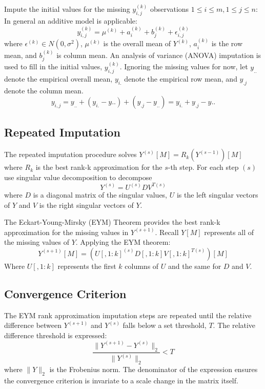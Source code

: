\documentclass[12pt,twoside]{dukestatscithesis}
\theoremstyle{definition}
\theoremstyle{definition}
\theoremstyle{definition}
\theoremstyle{remark}
\begin{document}
Impute the initial values for the missing \(y^{(k)}_{i,j}\) observations
\(1 \leq i \leq m, 1 \leq j \leq n\): In general an additive model is
applicable:
\[y^{(k)}_{i,j} = \mu^{(k)} + a^{(k)}_i + b^{(k)}_j + \epsilon^{(k)}_{i,j}\]
where \(\epsilon^{(k)} \in N(0,\sigma^2)\), \(\mu^{(k)}\) is the overall
mean of \(Y^{(k)}\), \(a^{(k)}_i\) is the row mean, and \(b^{(k)}_j\) is
column mean. An analysis of variance (ANOVA) imputation is used to fill
in the initial values, \(y^{(k)}_{i,j}\). Ignoring the missing values
for now, let \(y_{..}\) denote the empirical overall mean, \(y_{i.}\)
denote the empirical row mean, and \(y_{.j}\) denote the column mean.
\[y_{i,j} = y_{..} + (y_{i.}-y{..}) + (y_{.j}-y_{..}) = y_{i.} + y_{.j} - y{..}\]

\subsection{Repeated Imputation}\label{repeated-imputation}

The repeated imputation procedure solves
\(Y^{(s)}[M] = R_k(Y^{(s-1)})[M]\) where \(R_k\) is the best rank-k
approximation for the \(s\)-th step. For each step \((s)\) use singular
value decomposition to decompose \[Y^{(s)} =  U^{(s)}DV^{T(s)}\] where
\(D\) is a diagonal matrix of the singular values, \(U\) is the left
singular vectors of \(Y\) and \(V\) is the right singular vectors of
\(Y\).

The Eckart-Young-Mirsky (EYM) Theorem provides the best rank-k
approximation for the missing values in \(Y^{(s+1)}\). Recall \(Y[M]\)
represents all of the missing values of \(Y\). Applying the EYM theorem:
\[Y^{(s+1)}[M] = (U[,1:k]^{(s)}D[,1:k]V[,1:k]^{T(s)})[M]\] Where
\(U[,1:k]\) represents the first \(k\) columns of \(U\) and the same for
\(D\) and \(V\).

\subsection{Convergence Criterion}\label{convergence-criterion}

The EYM rank approximation imputation steps are repeated until the
relative difference between \(Y^{(s+1)}\) and \(Y^{(s)}\) falls below a
set threshold, \(T\). The relative difference threshold is expressed:
\[\frac{\|Y^{(s+1)}-Y^{(s)}\|_2}{\|Y^{(s)}\|_2} < T\] where \(\|Y\|_2\)
is the Frobenius norm. The denominator of the expression ensures the
convergence criterion is invariate to a scale change in the matrix
itself.
\end{document}
